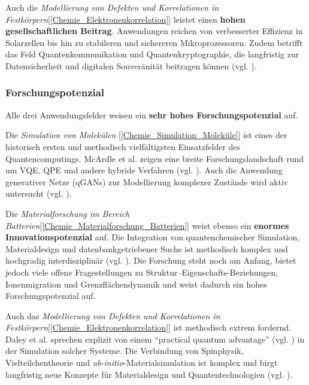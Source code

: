 \vspace{0.5em}

Auch die \textit{Modellierung von Defekten und Korrelationen in Festkörpern}[\ref{Chemie_Elektronenkorrelation}] leistet einen \textbf{hohen gesellschaftlichen Beitrag}. Anwendungen reichen von verbesserter Effizienz in Solarzellen bis hin zu stabileren und sichereren Mikroprozessoren. Zudem betrifft das Feld Quantenkommunikation und Quantenkryptographie, die langfristig zur Datensicherheit und digitalen Souveränität beitragen können (vgl. \cite{cao_ab_2023,bassett_quantum_2019}).


\subsubsection{Forschungspotenzial}

Alle drei Anwendungsfelder weisen ein \textbf{sehr hohes Forschungspotenzial} auf.

\vspace{0.5em}

Die \textit{Simulation von Molekülen} [\ref{Chemie_Simulation_Moleküle}] ist eines der historisch ersten und methodisch vielfältigsten Einsatzfelder des Quantencomputings. McArdle et al. zeigen eine breite Forschungslandschaft rund um VQE, QPE und andere hybride Verfahren (vgl. \cite{mcardle_quantum_2020}). Auch die Anwendung generativer Netze (qGANs) zur Modellierung komplexer Zustände wird aktiv untersucht (vgl. \cite{zoufal_quantum_2019}).

\vspace{0.5em}

Die \textit{Materialforschung im Bereich Batterien}[\ref{Chemie_Materialforschung_Batterien}] weist ebenso ein \textbf{enormes Innovationspotenzial} auf. Die Integration von quantenchemischer Simulation, Materialdesign und datenbankgetriebener Suche ist methodisch komplex und hochgradig interdisziplinär (vgl. \cite{urban_computational_2016}). Die Forschung steht noch am Anfang, bietet jedoch viele offene Fragestellungen zu Struktur–Eigenschafts-Beziehungen, Ionenmigration und Grenzflächendynamik und weist dadurch ein hohes Forschungspotenzial auf.

\vspace{0.5em}

Auch das \textit{Modellierung von Defekten und Korrelationen in Festkörpern}[\ref{Chemie_Elektronenkorrelation}] ist methodisch extrem fordernd. Daley et al. sprechen explizit von einem ``practical quantum advantage'' (vgl. \cite{daley_practical_2022}) in der Simulation solcher Systeme. Die Verbindung von Spinphysik, Vielteilchentheorie und \textit{ab-initio}-Materialsimulation ist komplex und birgt langfristig neue Konzepte für Materialdesign und Quantentechnologien (vgl. \cite{bassett_quantum_2019}).


